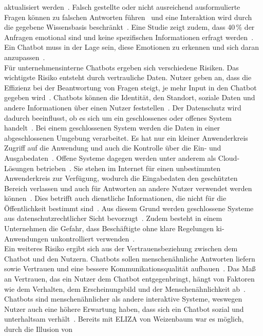 aktualisiert werden~\cite[3004]{cb01}. Falsch gestellte oder nicht ausreichend ausformulierte Fragen können zu falschen Antworten führen~\cite[238]{cb03} und eine 
Interaktion wird durch die gegebene Wissensbasis beschränkt~\cite[238]{cb03}. Eine Studie zeigt zudem, dass 40\,\% der Anfragen emotional sind und keine
spezifischen Informationen erfragt werden~\cite[3506]{cb15}. Ein Chatbot muss in der Lage sein, diese Emotionen zu erkennen und sich daran anzupassen~\cite[380]{cb02}. \\
Für unternehmensinterne Chatbots ergeben sich verschiedene Risiken. Das wichtigste Risiko entsteht durch vertrauliche Daten. Nutzer geben an, dass die Effizienz bei 
der Beantwortung von Fragen steigt, je mehr Input in den Chatbot gegeben wird~\cite[385]{cb02}. Chatbots können die Identität, den Standort, soziale Daten und 
andere Informationen über einen Nutzer feststellen~\cite[6]{cb04}. Der Datenschutz wird dadurch beeinflusst, ob es sich um ein geschlossenes oder offenes System
handelt~\cite[5]{cb12}. Bei einem geschlossenen System werden die Daten in einer abgeschlossenen Umgebung verarbeitet. Es hat nur ein kleiner 
Anwenderkreis Zugriff auf die Anwendung und auch die Kontrolle über die Ein- und Ausgabedaten~\cite[5]{cb12}. Offene Systeme dagegen werden unter anderem als 
Cloud-Lösungen betrieben~\cite[6]{cb12}. Sie stehen im Internet für einen unbestimmten Anwenderkreis zur Verfügung, wodurch die Eingabedaten den geschützten Bereich 
verlassen und auch für Antworten an andere Nutzer verwendet werden können~\cite[6]{cb12}. Dies betrifft auch dienstliche Informationen, die nicht für die Öffentlichkeit
bestimmt sind~\cite[6]{cb12}. Aus diesem Grund werden geschlossene Systeme aus datenschutzrechtlicher Sicht bevorzugt~\cite[6]{cb12}. Zudem besteht in einem 
Unternehmen die Gefahr, dass Beschäftigte ohne klare Regelungen \ac{ki}-Anwendungen unkontrolliert verwenden~\cite[9]{cb12}. \\
Ein weiteres Risiko ergibt sich aus der Vertrauensbeziehung zwischen dem Chatbot und den Nutzern. Chatbots sollen menschenähnliche Antworten liefern sowie Vertrauen 
und eine bessere Kommunikationsqualität aufbauen~\cite[6]{cb04}. Das Maß an Vertrauen, das ein Nutzer dem Chatbot entgegenbringt, hängt von Faktoren wie dem Verhalten,
dem Erscheinungsbild und der Menschenähnlichkeit ab~\cite[1]{cb11}. Chatbots sind menschenähnlicher als andere interaktive Systeme, weswegen Nutzer auch eine höhere 
Erwartung haben, dass sich ein Chatbot sozial und unterhaltsam verhält~\cite[388]{cb02}. Bereits mit ELIZA von Weizenbaum war es möglich, durch die Illusion von 
